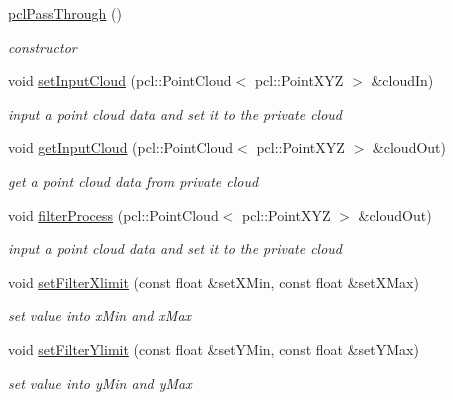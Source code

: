 \begin{DoxyCompactItemize}
\item 
\hyperlink{classpclPassThrough_a891b3ebe3bfa6744e594d89901597472}{pcl\+Pass\+Through} ()\hypertarget{classpclPassThrough_a891b3ebe3bfa6744e594d89901597472}{}\label{classpclPassThrough_a891b3ebe3bfa6744e594d89901597472}

\begin{DoxyCompactList}\small\item\em constructor \end{DoxyCompactList}\item 
void \hyperlink{classpclPassThrough_a16395691191d890443058cc26554aefc}{set\+Input\+Cloud} (pcl\+::\+Point\+Cloud$<$ pcl\+::\+Point\+X\+YZ $>$ \&cloud\+In)
\begin{DoxyCompactList}\small\item\em input a point cloud data and set it to the private cloud \end{DoxyCompactList}\item 
void \hyperlink{classpclPassThrough_aaba98ecaed175ce56a2bfa4d03ccfd36}{get\+Input\+Cloud} (pcl\+::\+Point\+Cloud$<$ pcl\+::\+Point\+X\+YZ $>$ \&cloud\+Out)
\begin{DoxyCompactList}\small\item\em get a point cloud data from private cloud \end{DoxyCompactList}\item 
void \hyperlink{classpclPassThrough_a7acf26c189c77927a022a4fe5a6997a1}{filter\+Process} (pcl\+::\+Point\+Cloud$<$ pcl\+::\+Point\+X\+YZ $>$ \&cloud\+Out)
\begin{DoxyCompactList}\small\item\em input a point cloud data and set it to the private cloud \end{DoxyCompactList}\item 
void \hyperlink{classpclPassThrough_a1391475d2a9979ae8a7b97bf56378097}{set\+Filter\+Xlimit} (const float \&set\+X\+Min, const float \&set\+X\+Max)
\begin{DoxyCompactList}\small\item\em set value into x\+Min and x\+Max \end{DoxyCompactList}\item 
void \hyperlink{classpclPassThrough_af6b79d0ba266b46054ff6703575bd7ed}{set\+Filter\+Ylimit} (const float \&set\+Y\+Min, const float \&set\+Y\+Max)
\begin{DoxyCompactList}\small\item\em set value into y\+Min and y\+Max \end{DoxyCompactList}\item 

\end{DoxyCompactItemize}
